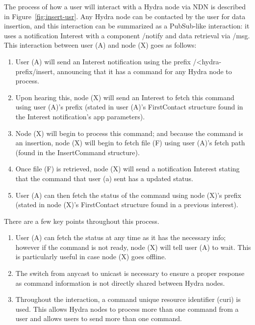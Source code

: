 The process of how a user will interact with a Hydra node via NDN is described in Figure~\ref{fig:insert-usr}. Any Hydra node can be contacted by the user for data insertion, and this interaction can be summarized as a PubSub-like interaction: it uses a notification Interest with a component /notify and data retrieval via /msg.
This interaction between user (A) and node (X) goes as follows:
\begin{enumerate}
    \item User (A) will send an Interest notification using the prefix /<hydra-prefix/insert, announcing that it has a command for any Hydra node to process.
    \item Upon hearing this, node (X) will send an Interest to fetch this command using user (A)'s prefix (stated in user (A)'s FirstContact structure found in the Interest notification's app parameters).
    \item Node (X) will begin to process this command; and because the command is an insertion, node (X) will begin to fetch file (F) using user (A)'s fetch path (found in the InsertCommand structure).
    \item Once file (F) is retrieved, node (X) will send a notification Interest stating that the command that user (a) sent has a updated status.
    \item User (A) can then fetch the status of the command using node (X)'s prefix (stated in node (X)'s FirstContact structure found in a previous interest).
\end{enumerate}

There are a few key points throughout this process.
\begin{enumerate}
    \item User (A) can fetch the status at any time as it has the necessary info; however if the command is not ready, node (X) will tell user (A) to wait. This is particularly useful in case node (X) goes offline. 
    \item The switch from anycast to unicast is necessary to ensure a proper response as command information is not directly shared between Hydra nodes.
    \item Throughout the interaction, a command unique resource identifier (curi) is used. This allows Hydra nodes to process more than one command from a user and allows users to send more than one command.
\end{enumerate}


